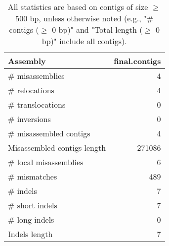 \documentclass[12pt,a4paper]{article}
\begin{document}
\begin{table}[ht]
\begin{center}
\caption{All statistics are based on contigs of size $\geq$ 500 bp, unless otherwise noted (e.g., "\# contigs ($\geq$ 0 bp)" and "Total length ($\geq$ 0 bp)" include all contigs).}
\begin{tabular}{|l*{1}{|r}|}
\hline
Assembly & final.contigs \\ \hline
\# misassemblies & 4 \\ \hline
\hspace{5mm}\# relocations & 4 \\ \hline
\hspace{5mm}\# translocations & 0 \\ \hline
\hspace{5mm}\# inversions & 0 \\ \hline
\# misassembled contigs & 4 \\ \hline
Misassembled contigs length & 271086 \\ \hline
\# local misassemblies & 6 \\ \hline
\# mismatches & 489 \\ \hline
\# indels & 7 \\ \hline
\hspace{5mm}\# short indels & 7 \\ \hline
\hspace{5mm}\# long indels & 0 \\ \hline
Indels length & 7 \\ \hline
\end{tabular}
\end{center}
\end{table}
\end{document}
